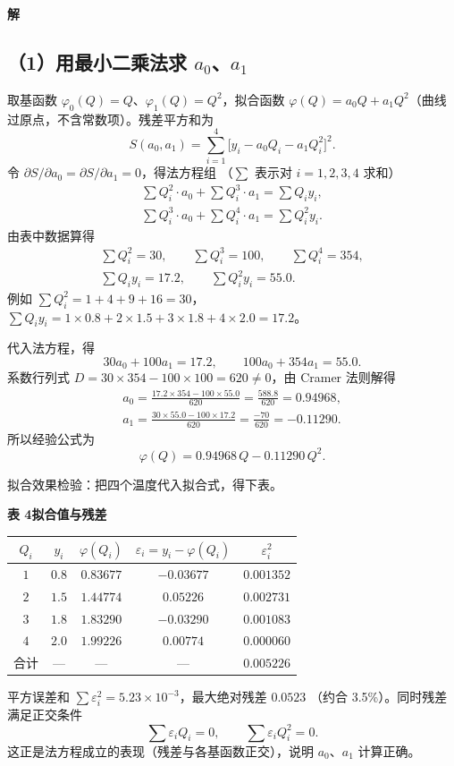 \documentclass[a4paper,11pt]{ctexart}
\begin{document}
\textbf{解}

\subsection*{（1）用最小二乘法求 $a_0$、$a_1$}
取基函数 $\varphi_0(Q)=Q$、$\varphi_1(Q)=Q^{2}$，拟合函数
$\varphi(Q)=a_0Q+a_1Q^{2}$（曲线过原点，不含常数项）。残差平方和为
\[
  S(a_0,a_1)=\sum_{i=1}^{4}\bigl[y_i-a_0Q_i-a_1Q_i^{2}\bigr]^{2}.
\]
令 $\partial S/\partial a_0=\partial S/\partial a_1=0$，得法方程组
（$\sum$ 表示对 $i=1,2,3,4$ 求和）
\begin{gather*}
  \sum Q_i^{2}\cdot a_0+\sum Q_i^{3}\cdot a_1=\sum Q_i y_i ,\\
  \sum Q_i^{3}\cdot a_0+\sum Q_i^{4}\cdot a_1=\sum Q_i^{2}y_i .
\end{gather*}
由表中数据算得
\begin{gather*}
  \sum Q_i^{2}=30,\qquad \sum Q_i^{3}=100,\qquad \sum Q_i^{4}=354 ,\\
  \sum Q_i y_i=17.2,\qquad \sum Q_i^{2}y_i=55.0 .
\end{gather*}
{\small 例如 $\sum Q_i^{2}=1+4+9+16=30$，
$\sum Q_i y_i=1\times0.8+2\times1.5+3\times1.8+4\times2.0=17.2$。}

代入法方程，得
\[
  30a_0+100a_1=17.2,\qquad 100a_0+354a_1=55.0 .
\]
系数行列式 $D=30\times354-100\times100=620\ne 0$，由 Cramer 法则解得
\begin{gather*}
  a_0=\frac{17.2\times354-100\times55.0}{620}=\frac{588.8}{620}=0.94968 ,\\
  a_1=\frac{30\times55.0-100\times17.2}{620}=\frac{-70}{620}=-0.11290 .
\end{gather*}
所以经验公式为
\[
  \varphi(Q)=0.94968\,Q-0.11290\,Q^{2}.
\]

拟合效果检验：把四个温度代入拟合式，得下表。
\begin{center}
  {\small\bfseries 表 4\quad 拟合值与残差}\\[0.4em]
  \renewcommand{\arraystretch}{1.2}
  \begin{tabular}{ccccc}
    \toprule
    $Q_i$ & $y_i$ & $\varphi(Q_i)$ & $\varepsilon_i=y_i-\varphi(Q_i)$
          & $\varepsilon_i^{2}$ \\
    \midrule
    $1$ & $0.8$ & $0.83677$ & $-0.03677$ & $0.001352$ \\
    $2$ & $1.5$ & $1.44774$ & $0.05226$  & $0.002731$ \\
    $3$ & $1.8$ & $1.83290$ & $-0.03290$ & $0.001083$ \\
    $4$ & $2.0$ & $1.99226$ & $0.00774$  & $0.000060$ \\
    \midrule
    合计 & --- & --- & --- & $0.005226$ \\
    \bottomrule
  \end{tabular}
\end{center}
平方误差和 $\sum\varepsilon_i^{2}=5.23\times10^{-3}$，最大绝对残差 $0.0523$
（约合 3.5\%）。同时残差满足正交条件
\[
  \sum\varepsilon_i Q_i=0,\qquad \sum\varepsilon_i Q_i^{2}=0 .
\]
这正是法方程成立的表现（残差与各基函数正交），说明 $a_0$、$a_1$ 计算正确。
\end{document}

